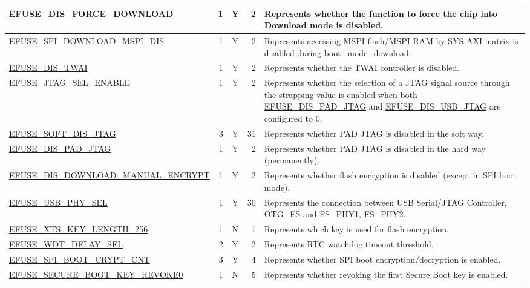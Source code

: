 \begin{longtable}[l]{ |m{8.2cm}|r|c|r|m{9cm}| }
    \hline
    \hyperref[fielddesc:EFUSEDISFORCEDOWNLOAD]{EFUSE\_DIS\_FORCE\_DOWNLOAD} & 1 & Y & 2 & Represents whether the function to force the chip into Download mode is disabled.\\
    \hline
    \hyperref[fielddesc:EFUSESPIDOWNLOADMSPIDIS]{EFUSE\_SPI\_DOWNLOAD\_MSPI\_DIS} & 1 & Y & 2 & Represents accessing MSPI flash/MSPI RAM by SYS AXI matrix is disabled during boot\_mode\_download. \\
    \hline
    \hyperref[fielddesc:EFUSEDISTWAI]{EFUSE\_DIS\_TWAI} & 1 & Y & 2 & Represents whether the TWAI controller is disabled. \\
    \hline
    \hyperref[fielddesc:EFUSEJTAGSELENABLE]{EFUSE\_JTAG\_SEL\_ENABLE} & 1 & Y & 2 & Represents whether the selection of a JTAG signal source through the strapping value is enabled when both \hyperref[fielddesc:EFUSEDISPADJTAG]{EFUSE\_DIS\_PAD\_JTAG} and \hyperref[fielddesc:EFUSEDISUSBJTAG]{EFUSE\_DIS\_USB\_JTAG} are configured to 0.\\
    \hline
    \hyperref[fielddesc:EFUSESOFTDISJTAG]{EFUSE\_SOFT\_DIS\_JTAG} & 3 & Y & 31 & Represents whether PAD JTAG is disabled in the soft way.\\
    \hline
    \hyperref[fielddesc:EFUSEDISPADJTAG]{EFUSE\_DIS\_PAD\_JTAG} & 1 & Y & 2 & Represents whether PAD JTAG is disabled in the hard way (permanently). \\
    \hline
    \hyperref[fielddesc:EFUSEDISDOWNLOADMANUALENCRYPT]{EFUSE\_DIS\_DOWNLOAD\_MANUAL\_ENCRYPT} &  1 & Y & 2 & Represents whether flash encryption is disabled (except in SPI boot mode).\\
    \hline
    \hyperref[fielddesc:EFUSEUSBPHYSEL]{EFUSE\_USB\_PHY\_SEL} &  1 & Y & 30 & Represents the connection between USB Serial/JTAG Controller, OTG\_FS and FS\_PHY1, FS\_PHY2. \\
    \hline
    \hyperref[fielddesc:EFUSEXTSKEYLENGTH256]{EFUSE\_XTS\_KEY\_LENGTH\_256} &  1 & N & 1 & Represents which key is used for flash encryption.\\
    \hline
    \hyperref[fielddesc:EFUSEWDTDELAYSEL]{EFUSE\_WDT\_DELAY\_SEL} & 2 & Y & 2 & Represents RTC watchdog timeout threshold.\\
    \hline
    \hyperref[fielddesc:EFUSESPIBOOTCRYPTCNT]{EFUSE\_SPI\_BOOT\_CRYPT\_CNT} & 3 & Y & 4 & Represents whether SPI boot encryption/decryption is enabled.\\
    \hline
    \hyperref[fielddesc:EFUSESECUREBOOTKEYREVOKE0]{EFUSE\_SECURE\_BOOT\_KEY\_REVOKE0} & 1 & N & 5 & Represents whether revoking the first Secure Boot key is enabled.\\

\end{longtable}
